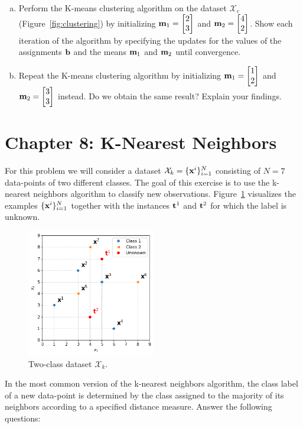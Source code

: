 \documentclass[11pt,a4paper]{article}
\begin{document}
\begin{enumerate}[(a)]

\item Perform the K-means clustering algorithm on the dataset $\mathcal{X}_c$ (Figure~\ref{fig:clustering}) by initializing ${\bf m}_1=\begin{bmatrix}2 \\ 3\end{bmatrix}$ and ${\bf m}_2=\begin{bmatrix}4\\2\end{bmatrix}$. Show each iteration of the algorithm by specifying the updates for the values of the assignments $\bf b$ and the means ${\bf m}_1$ and ${\bf m}_2$ until convergence.  

\item Repeat the K-means clustering algorithm by initializing ${\bf m}_1=\begin{bmatrix} 1 \\ 2 \end{bmatrix}$ and ${\bf m}_2=\begin{bmatrix} 3 \\ 3 \end{bmatrix}$ instead. Do we obtain the same result? Explain your findings.
\end{enumerate}


\section{Chapter 8: K-Nearest Neighbors}
For this problem we will consider a dataset $\mathcal{X}_k=\{{\bf x}^i\}_{i=1}^N$ consisting of $N=7$ data-points of two different classes. The goal of this exercise is to use the k-nearest neighbors algorithm to classify new observations. 
Figure~\ref{fig:knn} visualizes the examples $\{{\bf x}^i\}_{i=1}^N$ together with the instances ${\bf t}^1$ and ${\bf t}^2$ for which the label is unknown. 

\begin{figure}[!ht]
	\centering
	\includegraphics[width=0.5\textwidth]{k-nearest}
	\caption{Two-class dataset $\mathcal{X}_k$. 
}\label{fig:knn}
\end{figure}
In the most common version of the k-nearest neighbors algorithm, the class label of a new data-point is determined by the class assigned to the majority of its neighbors according to a specified distance measure. Answer the following questions:
\end{document}
